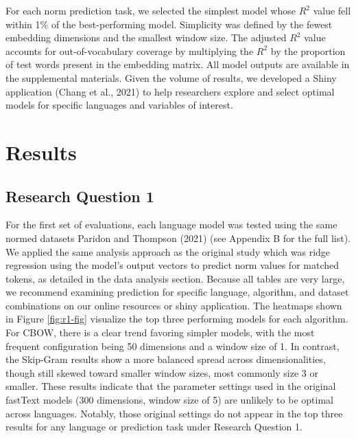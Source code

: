 \documentclass[
  english,
  man,floatsintext]{apa6}
\begin{document}
For each norm prediction task, we selected the simplest model whose \(R^2\) value fell within 1\% of the best-performing model. Simplicity was defined by the fewest embedding dimensions and the smallest window size. The adjusted \(R^2\) value accounts for out-of-vocabulary coverage by multiplying the \(R^2\) by the proportion of test words present in the embedding matrix. All model outputs are available in the supplemental materials. Given the volume of results, we developed a Shiny application (Chang et al., 2021) to help researchers explore and select optimal models for specific languages and variables of interest.

\section{Results}\label{results}

\subsection{Research Question 1}\label{research-question-1}

For the first set of evaluations, each language model was tested using the same normed datasets Paridon and Thompson (2021) (see Appendix B for the full list). We applied the same analysis approach as the original study which was ridge regression using the model's output vectors to predict norm values for matched tokens, as detailed in the data analysis section. Because all tables are very large, we recommend examining prediction for specific language, algorithm, and dataset combinations on our online resources or shiny application. The heatmaps shown in Figure \ref{fig:r1-fig} visualize the top three performing models for each algorithm. For CBOW, there is a clear trend favoring simpler models, with the most frequent configuration being 50 dimensions and a window size of 1. In contrast, the Skip-Gram results show a more balanced spread across dimensionalities, though still skewed toward smaller window sizes, most commonly size 3 or smaller. These results indicate that the parameter settings used in the original fastText models (300 dimensions, window size of 5) are unlikely to be optimal across languages. Notably, those original settings do not appear in the top three results for any language or prediction task under Research Question 1.
\end{document}
